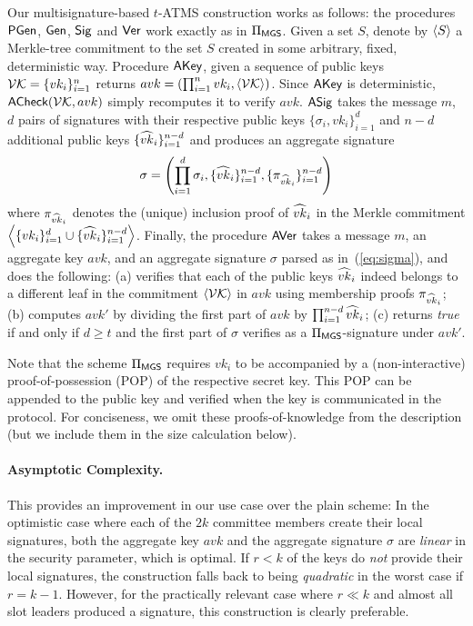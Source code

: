 Our multisignature-based $t$-ATMS construction works as follows: the procedures $\textsf{PGen}$,
$\mathsf{Gen}$, $\mathsf{Sig}$ and $\mathsf{Ver}$ work exactly as in $\Pi_{\textsf{MGS}}$.
Given a  set $S$, denote by $\left\langle S \right\rangle$ a Merkle-tree commitment to the set $S$ created
 in some arbitrary, fixed, deterministic way.
%
Procedure $\textsf{AKey}$, given a sequence
of public keys $\mathcal{VK}=\{vk_i\}_{i=1}^{n}$ returns
$avk=(\prod_{i=1}^{n}vk_i,\left\langle \mathcal{VK} \right\rangle)$.
%
Since $\textsf{AKey}$ is deterministic, $\textsf{ACheck}(\mathcal{VK},avk)$ simply recomputes it
to verify $avk$.
%
$\textsf{ASig}$ takes the message $m$, $d$ pairs of signatures with their respective public keys
$\{\sigma_i,vk_i\}_{i=1}^{d}$ and $n-d$ additional public keys
$\{\widehat{vk}_i\}_{i=1}^{n-d}$ and produces an aggregate signature
\begin{equation}
  \label{eq:sigma}
\sigma =
\left(
  \prod_{i=1}^{d}\sigma_i,
  \{\widehat{vk}_i\}_{i=1}^{n-d},
  \{\pi_{\widehat{vk}_i}\}_{i=1}^{n-d}
\right)
\end{equation}
where $\pi_{\widehat{vk}_i}$ denotes the (unique) inclusion proof of $\widehat{vk}_i$ in the
Merkle commitment $\left\langle \{vk_i\}_{i=1}^{d}\cup\{\widehat{vk}_i\}_{i=1}^{n-d} \right\rangle$.
%
Finally, the procedure $\textsf{AVer}$ takes
a message $m$,
an aggregate key $avk$,
and an aggregate signature $\sigma$ parsed as in~(\ref{eq:sigma}),
and does the following:
(a) verifies that each of the public keys $\widehat{vk}_i$ indeed belongs to a different
leaf in the commitment $\left\langle \mathcal{VK} \right\rangle$ in $avk$ using membership proofs
$\pi_{\widehat{vk}_i}$;
(b) computes $avk'$ by dividing the first part of $avk$ by
$\prod_{i=1}^{n-d}\widehat{vk}_i$;
(c) returns \emph{true} if and only if $d\geq t$ and the first part of $\sigma$
verifies as a $\Pi_{\textsf{MGS}}$-signature under $avk'$.

Note that  the scheme $\Pi_{\textsf{MGS}}$ requires $vk_i$ to be  accompanied by a (non-interactive)
proof-of-possession (POP) \cite{pop} of the respective secret key.  This POP can be
appended to the public key and verified when the key is communicated in the
protocol.  For conciseness, we omit these proofs-of-knowledge from the
description (but we include them in the size calculation below).

\paragraph{Asymptotic Complexity.}
This provides an improvement in our use case over the plain scheme:
In the optimistic case where each of the
$2k$ committee members create their local signatures,
both the aggregate key $avk$ and the aggregate signature $\sigma$ are
\emph{linear} in the security parameter, which is optimal.
If %
$r<k$ of the keys do \emph{not} provide their local signatures,  the construction falls back
to being \emph{quadratic} in the worst case if $r = k - 1$.
However, for the
practically relevant case where
$r \ll k$ and almost all slot leaders produced a signature, this construction is
clearly preferable.

